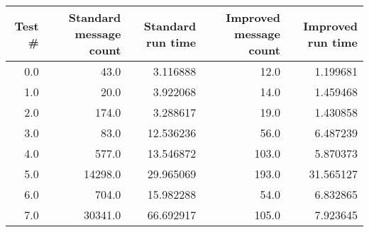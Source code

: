 \begin{tabular}{rrrrr}
\toprule
 Test \# &  Standard message count &  Standard run time &  Improved message count &  Improved run time \\
\midrule
    0.0 &                    43.0 &           3.116888 &                    12.0 &           1.199681 \\
    1.0 &                    20.0 &           3.922068 &                    14.0 &           1.459468 \\
    2.0 &                   174.0 &           3.288617 &                    19.0 &           1.430858 \\
    3.0 &                    83.0 &          12.536236 &                    56.0 &           6.487239 \\
    4.0 &                   577.0 &          13.546872 &                   103.0 &           5.870373 \\
    5.0 &                 14298.0 &          29.965069 &                   193.0 &          31.565127 \\
    6.0 &                   704.0 &          15.982288 &                    54.0 &           6.832865 \\
    7.0 &                 30341.0 &          66.692917 &                   105.0 &           7.923645 \\
\bottomrule
\end{tabular}
